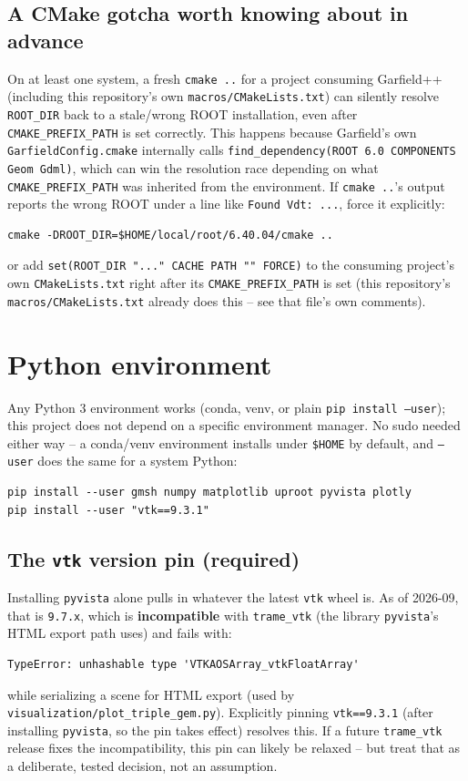 \documentclass[11pt]{article}
\begin{document}
\subsection{A CMake gotcha worth knowing about in advance}

On at least one system, a fresh \texttt{cmake ..} for a project
consuming Garfield++ (including this repository's own
\texttt{macros/CMakeLists.txt}) can silently resolve \texttt{ROOT\_DIR}
back to a stale/wrong ROOT installation, even after
\texttt{CMAKE\_PREFIX\_PATH} is set correctly. This happens because
Garfield's own \texttt{GarfieldConfig.cmake} internally calls
\texttt{find\_dependency(ROOT 6.0 COMPONENTS Geom Gdml)}, which can win
the resolution race depending on what \texttt{CMAKE\_PREFIX\_PATH} was
inherited from the environment. If \texttt{cmake ..}'s output reports the
wrong ROOT under a line like \texttt{Found Vdt: ...}, force it
explicitly:
\begin{lstlisting}
cmake -DROOT_DIR=$HOME/local/root/6.40.04/cmake ..
\end{lstlisting}
or add \texttt{set(ROOT\_DIR "..." CACHE PATH "" FORCE)} to the
consuming project's own \texttt{CMakeLists.txt} right after its
\texttt{CMAKE\_PREFIX\_PATH} is set (this repository's
\texttt{macros/CMakeLists.txt} already does this -- see that file's own
comments).

\section{Python environment}
\label{sec:python}

Any Python 3 environment works (conda, venv, or plain \texttt{pip install
--user}); this project does not depend on a specific environment manager.
No sudo needed either way -- a conda/venv environment installs under
\texttt{\$HOME} by default, and \texttt{--user} does the same for a
system Python:

\begin{lstlisting}
pip install --user gmsh numpy matplotlib uproot pyvista plotly
pip install --user "vtk==9.3.1"
\end{lstlisting}

\subsection{The \texttt{vtk} version pin (required)}

Installing \texttt{pyvista} alone pulls in whatever the latest
\texttt{vtk} wheel is. As of 2026-09, that is \texttt{9.7.x}, which is
\textbf{incompatible} with \texttt{trame\_vtk} (the library
\texttt{pyvista}'s HTML export path uses) and fails with:
\begin{lstlisting}
TypeError: unhashable type 'VTKAOSArray_vtkFloatArray'
\end{lstlisting}
while serializing a scene for HTML export (used by
\texttt{visualization/plot\_triple\_gem.py}). Explicitly pinning
\texttt{vtk==9.3.1} (after installing \texttt{pyvista}, so the pin takes
effect) resolves this. If a future \texttt{trame\_vtk} release fixes the
incompatibility, this pin can likely be relaxed -- but treat that as a
deliberate, tested decision, not an assumption.
\end{document}
